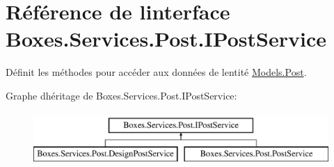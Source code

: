 \hypertarget{interface_boxes_1_1_services_1_1_post_1_1_i_post_service}{}\section{Référence de l\textquotesingle{}interface Boxes.\+Services.\+Post.\+I\+Post\+Service}
\label{interface_boxes_1_1_services_1_1_post_1_1_i_post_service}


Définit les méthodes pour accéder aux données de l\textquotesingle{}entité \hyperlink{class_boxes_1_1_models_1_1_post}{Models.\+Post}.  


Graphe d\textquotesingle{}héritage de Boxes.\+Services.\+Post.\+I\+Post\+Service\+:\begin{figure}[H]
\begin{center}
\leavevmode
\includegraphics[height=2.000000cm]{interface_boxes_1_1_services_1_1_post_1_1_i_post_service}
\end{center}
\end{figure}
